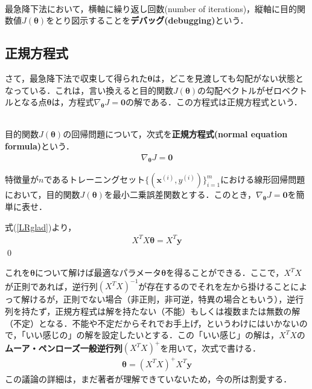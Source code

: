 \begin{defi}[デバッグ]
　\\
最急降下法において，横軸に繰り返し回数(number of iterations)，縦軸に目的関数値$J({\bm \theta})$をとり図示することを{\bf デバッグ(debugging)}という．
\end{defi}

\subsection{正規方程式}

さて，最急降下法で収束して得られた${\bm \theta}$は，どこを見渡しても勾配がない状態となっている．これは，言い換えると目的関数$J({\bm \theta})$の勾配ベクトルがゼロベクトルとなる点${\bm \theta}$は，方程式$\nabla_{{\bm \theta}}J={\bm 0}$の解である．この方程式は正規方程式という．
\begin{defi}[正規方程式]
　\\
目的関数$J({\bm \theta})$の回帰問題について，次式を{\bf 正規方程式(normal equation formula)}という．
\begin{align}
\nabla_{{\bm \theta}}J={\bm 0}
\end{align}
\end{defi}

\begin{qu}
特徴量が$n$であるトレーニングセット$\{({\bm x}^{(i)},y^{(i)})\}_{i=1}^m$における線形回帰問題において，目的関数$J({\bm \theta})$を最小二乗誤差関数とする．このとき，$\nabla_{{\bm \theta}}J={\bm 0}$を簡単に表せ．
\end{qu}
\begin{ans}
式(\ref{LRglad})より，
\begin{align}
X^TX{\bm \theta}=X^T{\bm y}	
\end{align}\qed
\end{ans}
これを${\bm \theta}$について解けば最適なパラメータ${\bm \theta}$を得ることができる．ここで，$X^TX$が正則であれば，逆行列$(X^TX)^{-1}$が存在するのでそれを左から掛けることによって解けるが，正則でない場合（非正則，非可逆，特異の場合ともいう），逆行列を持たず，正規方程式は解を持たない（不能）もしくは複数または無数の解（不定）となる．不能や不定だからそれでお手上げ，というわけにはいかないので，「いい感じの」の解を設定したいとする．この「いい感じ」の解は，$X^TX$の{\bf ムーア・ペンローズ一般逆行列}$(X^TX)^+$を用いて，次式で書ける．
\begin{align}
{\bm \theta}=(X^TX)^+ X^T{\bm y}
\end{align}
この議論の詳細は，まだ著者が理解できていないため，今の所は割愛する．

